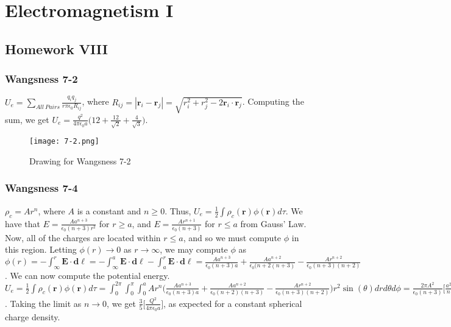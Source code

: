 \documentclass[crop=false,class=article,oneside]{standalone}
\begin{document}
    \ifx\ifsub\undefined
        \section*{Electromagnetism I}
        \setcounter{section}{8}
        \renewcommand\thesubfigure{%
            \arabic{section}.\arabic{figure}.\arabic{subfigure}%
        }
    \fi
    \subsection{Homework VIII}
        \subsubsection{Wangsness 7-2}
        $U_e = \underset{All\ Pairs}\sum\frac{q_i q_j}{r\pi \epsilon_0 R_{ij}}$, where $R_{ij} = |\mathbf{r}_i-\mathbf{r}_j| = \sqrt{r_i^2+r_j^2 -2\mathbf{r}_i\cdot \mathbf{r}_j}$. Computing the sum, we get $U_e = \frac{q^2}{4\pi \epsilon_0 a}\big(12 + \frac{12}{\sqrt{2}}+\frac{4}{\sqrt{3}}\big)$.
        \begin{figure}[htbp]
            \centering
            {\texttt{[image: 7-2.png]}}
            \caption{Drawing for Wangsness 7-2}
        \end{figure}
        \subsubsection{Wangsness 7-4}
        $\rho_c = Ar^n$, where $A$ is a constant and $n\geq 0$. Thus, $U_e = \frac{1}{2} \int \rho_c(\mathbf{r})\phi(\mathbf{r})d\tau$. We have that $E = \frac{Aa^{n+3}}{\epsilon_0 (n+3)r^2}$ for $r\geq a$, and $E=\frac{Ar^{n+1}}{\epsilon_0(n+3)}$ for $r\leq a$ from Gauss' Law. Now, all of the charges are located within $r\leq a$, and so we must compute $\phi$ in this region. Letting $\phi(r)\rightarrow 0$ as $r\rightarrow \infty$, we may compute $\phi$ as $\phi(r) = -\int_{\infty}^{r}\mathbf{E}\cdot \mathbf{d\ell} = -\int_{\infty}^{a} \mathbf{E}\cdot \mathbf{d\ell} - \int_{a}^{r}\mathbf{E}\cdot \mathbf{d\ell} = \frac{Aa^{n+3}}{\epsilon_0(n+3)a}+\frac{Aa^{n+2}}{\epsilon_0(n+2(n+3)}-\frac{Ar^{n+2}}{\epsilon_0(n+3)(n+2)}$. We can now compute  the potential energy. $U_e =\frac{1}{2}\int \rho_c(\mathbf{r})\phi(\mathbf{r})d\tau = \int_{0}^{2\pi} \int_{0}^{\pi}\int_{0}^{a} A r^n \bigg(\frac{Aa^{n+3}}{\epsilon_0(n+3)a}+\frac{Aa^{n+2}}{\epsilon_0(n+2)(n+3)}-\frac{Ar^{n+2}}{\epsilon_0(n+3)(n+2)}\bigg)r^2 \sin(\theta)dr d\theta d\phi = \frac{2\pi A^2}{\epsilon_0 (n+3)}\bigg[\frac{a^{2n+5}}{n+3}+\frac{a^{2n+5}}{(n+2)(n+3)}-\frac{a^{2n+5}}{(n+2)(2n+5)}\bigg]$. Taking the limit as $n\rightarrow 0$, we get $\frac{3}{5}\bigg[\frac{Q^2}{4\pi \epsilon_0 a}\bigg]$, as expected for a constant spherical charge density.
\end{document}

